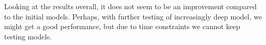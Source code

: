 Looking at the results overall, it does not seem to be an improvement compared to the initial models. Perhaps, with further testing of increasingly deep model, we might get a good performance, but due to time constraints we cannot keep testing models.

